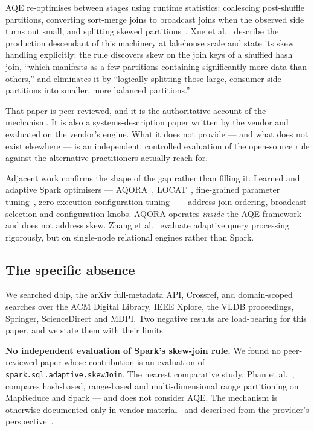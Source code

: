 AQE re-optimises between stages using runtime statistics: coalescing
post-shuffle partitions, converting sort-merge joins to broadcast joins when
the observed side turns out small, and splitting skewed
partitions~\cite{databricks_aqe, spark_aqe_docs}. Xue et
al.~\cite{xue2024adaptive} describe the production descendant of this machinery
at lakehouse scale and state its skew handling explicitly: the rule discovers
skew on the join keys of a shuffled hash join, ``which manifests as a few
partitions containing significantly more data than others,'' and eliminates it
by ``logically splitting those large, consumer-side partitions into smaller,
more balanced partitions.''

That paper is peer-reviewed, and it is the authoritative account of the
mechanism. It is also a systems-description paper written by the vendor and
evaluated on the vendor's engine. What it does not provide --- and what does not
exist elsewhere --- is an independent, controlled evaluation of the open-source
rule against the alternative practitioners actually reach for.

Adjacent work confirms the shape of the gap rather than filling it. Learned and
adaptive Spark optimisers --- AQORA~\cite{he2025aqora},
LOCAT~\cite{xin2022locat}, fine-grained parameter tuning~\cite{lyu2024sparkopt},
zero-execution configuration tuning~\cite{suri2025zeroexec} --- address join
ordering, broadcast selection and configuration knobs. AQORA operates
\emph{inside} the AQE framework and does not address skew. Zhang et
al.~\cite{zhang2023adaptive} evaluate adaptive query processing rigorously, but
on single-node relational engines rather than Spark.

\subsection{The specific absence}

We searched dblp, the arXiv full-metadata API, Crossref, and domain-scoped
searches over the ACM Digital Library, IEEE Xplore, the VLDB proceedings,
Springer, ScienceDirect and MDPI. Two negative results are load-bearing for
this paper, and we state them with their limits.

\textbf{No independent evaluation of Spark's skew-join rule.} We found no
peer-reviewed paper whose contribution is an evaluation of
\texttt{spark.sql.adaptive.skewJoin}. The nearest comparative study, Phan et
al.~\cite{phan2022skewjoin}, compares hash-based, range-based and
multi-dimensional range partitioning on MapReduce and Spark --- and does not
consider AQE. The mechanism is otherwise documented only in vendor
material~\cite{databricks_aqe, spark_aqe_docs} and described from the
provider's perspective~\cite{xue2024adaptive}.

